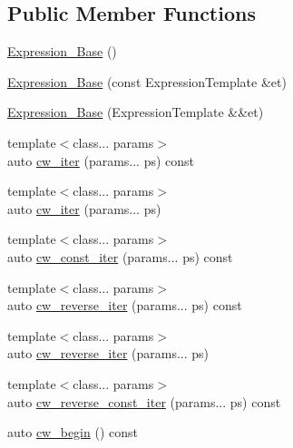 \subsection*{Public Member Functions}
\begin{DoxyCompactItemize}
\item 
\hyperlink{classbc_1_1tensors_1_1Expression__Base_aa0eeffb8b5d42ef4cdaee3e1bf9a9041}{Expression\+\_\+\+Base} ()
\item 
\hyperlink{classbc_1_1tensors_1_1Expression__Base_ab0fcc3b4649746176439c14feed65561}{Expression\+\_\+\+Base} (const Expression\+Template \&et)
\item 
\hyperlink{classbc_1_1tensors_1_1Expression__Base_a164f00ae9eb693d16d4707cd51cf9248}{Expression\+\_\+\+Base} (Expression\+Template \&\&et)
\item 
{\footnotesize template$<$class... params$>$ }\\auto \hyperlink{classbc_1_1tensors_1_1Expression__Base_abfdc8d0379441d705afd5747a26a031d}{cw\+\_\+iter} (params... ps) const
\item 
{\footnotesize template$<$class... params$>$ }\\auto \hyperlink{classbc_1_1tensors_1_1Expression__Base_ae5037e9e9f9aa3805f33300656aca202}{cw\+\_\+iter} (params... ps)
\item 
{\footnotesize template$<$class... params$>$ }\\auto \hyperlink{classbc_1_1tensors_1_1Expression__Base_af99fae801adc324ca99c2473813fc992}{cw\+\_\+const\+\_\+iter} (params... ps) const
\item 
{\footnotesize template$<$class... params$>$ }\\auto \hyperlink{classbc_1_1tensors_1_1Expression__Base_a224d31840c832a28299cc60e3a6030fd}{cw\+\_\+reverse\+\_\+iter} (params... ps) const
\item 
{\footnotesize template$<$class... params$>$ }\\auto \hyperlink{classbc_1_1tensors_1_1Expression__Base_aef6156b25763eda80184e7d94d118842}{cw\+\_\+reverse\+\_\+iter} (params... ps)
\item 
{\footnotesize template$<$class... params$>$ }\\auto \hyperlink{classbc_1_1tensors_1_1Expression__Base_a5a5e85ef9d8f70ba7d6ec61779aa5d48}{cw\+\_\+reverse\+\_\+const\+\_\+iter} (params... ps) const
\item 
auto \hyperlink{classbc_1_1tensors_1_1Expression__Base_ab7254a15d10156123aec300006eb1c9d}{cw\+\_\+begin} () const
\item 

\end{DoxyCompactItemize}
